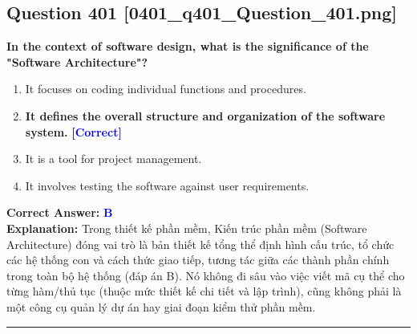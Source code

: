 \documentclass[11pt,a4paper]{article}
\begin{document}
\begin{minipage}{\textwidth}
\subsection*{Question 401 \quad \footnotesize{[0401\_q401\_Question\_401.png]}}
\noindent \textbf{In the context of software design, what is the significance of the "Software Architecture"?}

\begin{enumerate}[label=\Alph*.]
    \item It focuses on coding individual functions and procedures.
    \item \textbf{It defines the overall structure and organization of the software system.} \hfill \textcolor{blue}{\textbf{[Correct]}}
    \item It is a tool for project management.
    \item It involves testing the software against user requirements.
\end{enumerate}

\noindent \textbf{Correct Answer:} \textcolor{blue}{\textbf{B}} \\[2pt]
\noindent \textbf{Explanation:} Trong thiết kế phần mềm, Kiến trúc phần mềm (Software Architecture) đóng vai trò là bản thiết kế tổng thể định hình cấu trúc, tổ chức các hệ thống con và cách thức giao tiếp, tương tác giữa các thành phần chính trong toàn bộ hệ thống (đáp án B). Nó không đi sâu vào việc viết mã cụ thể cho từng hàm/thủ tục (thuộc mức thiết kế chi tiết và lập trình), cũng không phải là một công cụ quản lý dự án hay giai đoạn kiểm thử phần mềm.

\par\vspace{0.3cm}
\hrule
\vspace{0.3cm}
\end{minipage}
\end{document}
